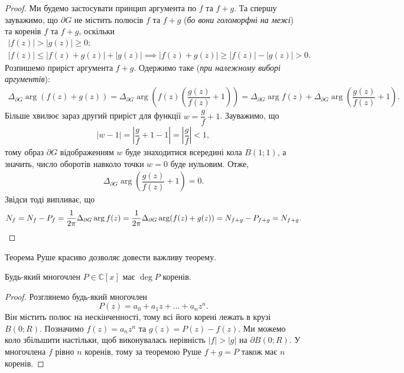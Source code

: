 \documentclass{math_library}
\begin{document}
\begin{proof}
Ми будемо застосувати принцип аргумента по $f$ та $f+g$. Та спершу зауважимо, що $\partial G$ не містить полюсів $f$ та $f+g$ (\textit{бо вони голоморфні на межі}) та коренів $f$ та $f+g$, оскільки
\begin{align*}
|f(z)| > |g(z)| \geq 0; \\
|f(z)| \leq |f(z)+g(z)| + |g(z)| \implies |f(z)+g(z)| \geq |f(z)| - |g(z)| > 0.
\end{align*}
Розпишемо приріст аргумента $f+g$. Одержимо таке (\textit{при належному виборі аргументів}):
\begin{align*}
\Delta_{\partial G} \arg (f(z)+g(z)) = \Delta_{\partial G} \arg \left( f(z) \left( \dfrac{g(z)}{f(z)} + 1 \right) \right) = \Delta_{\partial G} \arg f(z) + \Delta_{\partial G} \arg \left( \dfrac{g(z)}{f(z)} +1 \right).
\end{align*}
Більше хвилює зараз другий приріст для функції $w = \dfrac{g}{f} + 1$. Зауважимо, що
\begin{align*}
|w-1| = \left| \dfrac{g}{f}+1-1 \right| = \left| \dfrac{g}{f} \right| < 1,
\end{align*}
тому образ $\partial G$ відображенням $w$ буде знаходитися всередині кола $B(1;1)$, а значить, число оборотів навколо точки $w = 0$ буде нульовим. Отже,
\begin{align*}
\Delta_{\partial G} \arg \left( \dfrac{g(z)}{f(z)} +1 \right) = 0.
\end{align*}
Звідси тоді випливає, що
\[
N_f = N_f - P_f = \dfrac{1}{2 \pi} \Delta_{\partial G} \arg f(z) = \dfrac{1}{2\pi} \Delta_{\partial G} \arg (f(z) + g(z)) = N_{f+g} - P_{f+g} = N_{f+g}. \qedhere
\]
\end{proof}

Теорема Руше красиво дозволяє довести важливу теорему.

\begin{theorem}
Будь-який многочлен $P \in \mathbb{C}[x]$ має $\deg P$ коренів.
\end{theorem}

\begin{proof}
Розглянемо будь-який многочлен
\[
P(z) = a_0 + a_1 z + \dots + a_n z^n.
\]
Він містить полюс на нескінченності, тому всі його корені лежать в крузі $B(0;R)$. Позначимо $f(z) = a_n z^n$ та $g(z) = P(z) - f(z)$. Ми можемо коло збільшити настільки, щоб виконувалась нерівність $|f| > |g|$ на $\partial B(0;R)$. У многочлена $f$ рівно $n$ коренів, тому за теоремою Руше $f+g = P$ також має $n$ коренів.
\end{proof}
\end{document}
